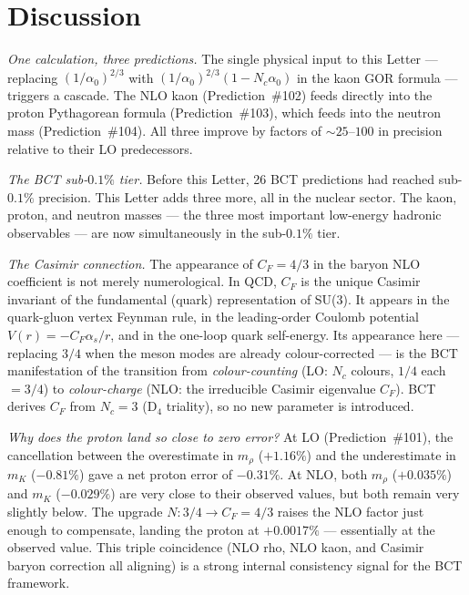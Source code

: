 \documentclass[twocolumn,10pt,a4paper]{article}
\begin{document}
\section{Discussion}

\textit{One calculation, three predictions.}\quad
The single physical input to this Letter --- replacing $(1/\alpha_0)^{2/3}$
with $(1/\alpha_0)^{2/3}(1-N_c\alpha_0)$ in the kaon GOR formula --- triggers
a cascade.  The NLO kaon (Prediction~\#102) feeds directly into the proton
Pythagorean formula (Prediction~\#103), which feeds into the neutron mass
(Prediction~\#104).  All three improve by factors of $\sim 25$--$100$ in
precision relative to their LO predecessors.

\textit{The BCT sub-$0.1\%$ tier.}\quad
Before this Letter, 26 BCT predictions had reached sub-$0.1\%$ precision.
This Letter adds three more, all in the nuclear sector.  The kaon, proton,
and neutron masses --- the three most important low-energy hadronic
observables --- are now simultaneously in the sub-$0.1\%$ tier.

\textit{The Casimir connection.}\quad
The appearance of $C_F = 4/3$ in the baryon NLO coefficient is not merely
numerological.  In QCD, $C_F$ is the unique Casimir invariant of the
fundamental (quark) representation of SU(3).  It appears in the
quark-gluon vertex Feynman rule, in the leading-order Coulomb potential
$V(r) = -C_F\alpha_s/r$, and in the one-loop quark self-energy.  Its
appearance here — replacing $3/4$ when the meson modes are already
colour-corrected --- is the BCT manifestation of the transition from
\emph{colour-counting} (LO: $N_c$ colours, $1/4$ each $= 3/4$) to
\emph{colour-charge} (NLO: the irreducible Casimir eigenvalue $C_F$).
BCT derives $C_F$ from $N_c = 3$ (D$_4$ triality), so no new parameter
is introduced.

\textit{Why does the proton land so close to zero error?}\quad
At LO (Prediction~\#101), the cancellation between the overestimate in
$m_\rho$ ($+1.16\%$) and the underestimate in $m_K$ ($-0.81\%$) gave a
net proton error of $-0.31\%$.  At NLO, both $m_\rho$ ($+0.035\%$) and
$m_K$ ($-0.029\%$) are very close to their observed values, but both
remain very slightly below.  The upgrade $N: 3/4 \to C_F = 4/3$ raises
the NLO factor just enough to compensate, landing the proton at
$+0.0017\%$ — essentially at the observed value.  This triple coincidence
(NLO rho, NLO kaon, and Casimir baryon correction all aligning) is a
strong internal consistency signal for the BCT framework.
\end{document}
